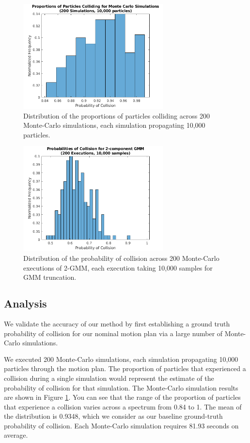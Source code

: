 \documentclass[journal]{IEEEtran}
\begin{document}
\begin{figure}[!t]
\centering
\includegraphics[width=3in]{mc_props.png}
\caption{Distribution of the proportions of particles colliding across 200 Monte-Carlo simulations, each simulation propagating 10,000 particles.}
\label{result_1}
\end{figure}

\begin{figure}[!t]
\centering
\includegraphics[width=3in]{GMM2_props.png}
\caption{Distribution of the probability of collision across 200 Monte-Carlo executions of 2-GMM, each execution taking 10,000 samples for GMM truncation.}
\label{result_2}
\end{figure}

\subsection{Analysis}
We validate the accuracy of our method by first establishing a ground truth probability of collision for our nominal motion plan via a large number of Monte-Carlo simulations.

We executed 200 Monte-Carlo simulations, each simulation propagating 10,000 particles through the motion plan. The proportion of particles that experienced a collision during a single simulation would represent the estimate of the probability of collision for that simulation. The Monte-Carlo simulation results are shown in Figure \ref{result_1}. You can see that the range of the proportion of particles that experience a collision varies across a spectrum from 0.84 to 1. The mean of the distribution is 0.9348, which we consider as our baseline ground-truth probability of collision. Each Monte-Carlo simulation requires 81.93 seconds on average.
\end{document}
